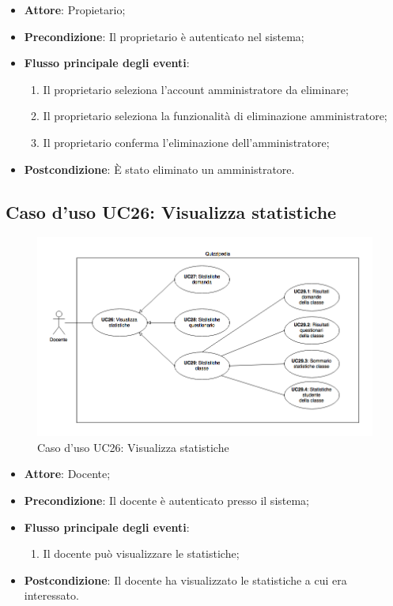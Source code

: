 \documentclass[12pt,a4paper]{article}
\begin{document}
\begin{itemize}

\item \textbf{Attore}: Propietario; 
\item \textbf{Precondizione}: Il proprietario è autenticato nel sistema;

\item \textbf{Flusso principale degli eventi}:
\begin{enumerate}
	\item Il proprietario seleziona l'account amministratore da eliminare;
	\item Il proprietario seleziona la funzionalità di eliminazione amministratore;
	\item Il proprietario conferma l'eliminazione dell'amministratore;
	
\end{enumerate}
\item \textbf{Postcondizione}: È stato eliminato un amministratore.
\end{itemize}
\hypertarget{UC26}{}
\subsection{Caso d'uso UC26: Visualizza statistiche}
\begin{figure}[H]
    \centering
	\includegraphics[width=\textwidth]{diagramUC26.png}
	\caption{Caso d'uso UC26: Visualizza statistiche}\label{fig:UC26} 
\end{figure}
\begin{itemize}

\item \textbf{Attore}: Docente; 
\item \textbf{Precondizione}: Il docente è autenticato presso il sistema;

\item \textbf{Flusso principale degli eventi}:
\begin{enumerate}
	\item Il docente può visualizzare le statistiche;
	
\end{enumerate}
\item \textbf{Postcondizione}: Il docente ha visualizzato le statistiche a cui era interessato.
\end{itemize}
\hypertarget{UC27}{}
\end{document}
